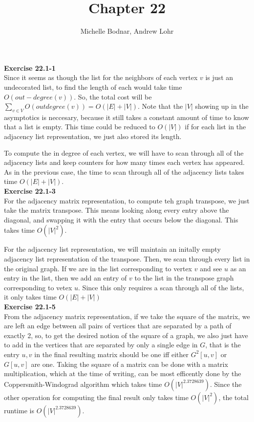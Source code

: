 \documentclass{article}
\title{Chapter 22}
\author{Michelle Bodnar, Andrew Lohr}
\begin{document}
\maketitle


\noindent\textbf{Exercise 22.1-1}\\
Since it seems as though the list for the neighbors of each vertex $v$ is just an undecorated list, to find the length of each would take time $O(out-degree(v))$. So, the total cost will be $\sum_{v\in V} O(outdegree(v)) = O(|E| +|V|)$. Note that the $|V|$ showing up in the asymptotics is neccesary, because it still takes a constant amount of time to know that a list is empty. This time could be reduced to $O(|V|)$ if for each list in the adjacency list representation, we just also stored its length.

To compute the in degree of each vertex, we will have to scan through all of the adjacency lists and keep counters for how many times each vertex has appeared. As in the previous case, the time to scan through all of the adjacency lists takes time $O(|E|+|V|)$.\\

\noindent\textbf{Exercise 22.1-3}\\
For the adjacency matrix representation, to compute teh graph transpose, we just take the matrix transpose. This means looking along every entry above the diagonal, and swapping it with the entry that occurs below the diagonal. This takes time $O(|V|^2)$.

For the adjacency list representation, we will maintain an initally empty adjacency list representation of the transpose. Then, we scan through every list in the original graph. If we are in the list corresponding to vertex $v$ and see $u$ as an entry in the list, then we add an entry of $v$ to the list in the transpose graph corresponding to vetex $u$. Since this only requires a scan through all of the lists, it only takes time $O(|E|+|V|)$\\

\noindent\textbf{Exercise 22.1-5}\\
From the adjacency matrix representation, if we take the square of the matrix, we are left an edge between all pairs of vertices that are separated by a path of exactly 2, so, to get the desired notion of the square of a graph, we also just have to add in the vertices that are separated by only a single edge in $G$, that is the entry $u,v$ in the final resulting matrix should be one iff either $G^2[u,v]$ or $G[u,v]$ are one. Taking the square of a matrix can be done with a matrix multiplication, which at the time of writing, can be most efficently done by the Coppersmith-Windograd algorithm which takes time $O(|V|^{2.3728639})$. Since the other operation for computing the final result only takes time $O(|V|^2)$, the total runtime is $O(|V|^{2.3728639})$. 
\end{document}
